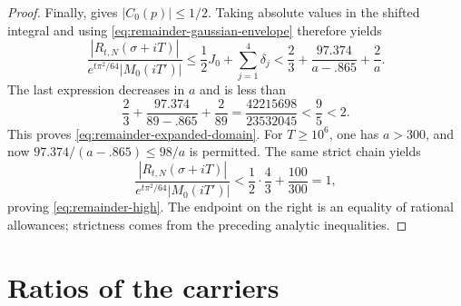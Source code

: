 \documentclass[11pt]{article}
\theoremstyle{remark}
\numberwithin{equation}{section}
\begin{document}
\begin{proof}
Finally, \cite[equation (58)]{polymath} gives $|C_0(p)|\le1/2$.
Taking absolute values in the shifted integral and using
\eqref{eq:remainder-gaussian-envelope} therefore yields
\[
 \frac{|R_{t,N}(\sigma+iT)|}
 {e^{t\pi^2/64}|M_0(iT')|}
 \le\frac12J_0+\sum_{j=1}^{4}\delta_j
 <\frac23+\frac{97.374}{a-.865}+\frac2a.
\]
The last expression decreases in $a$ and is less than
\[
 \frac23+\frac{97.374}{89-.865}+\frac2{89}
 =\frac{42215698}{23532045}<\frac95<2.
\]
This proves \eqref{eq:remainder-expanded-domain}.
For $T\ge10^6$, one has $a>300$, and now
$97.374/(a-.865)\le98/a$ is permitted. The same strict chain yields
\[
 \frac{|R_{t,N}(\sigma+iT)|}{e^{t\pi^2/64}|M_0(iT')|}
 <\frac12\cdot\frac43+\frac{100}{300}=1,
\]
proving \eqref{eq:remainder-high}. The endpoint on the right is an
equality of rational allowances; strictness comes from the preceding
analytic inequalities.
\end{proof}

\section{Ratios of the carriers}\label{sec:carriers}
\end{document}
